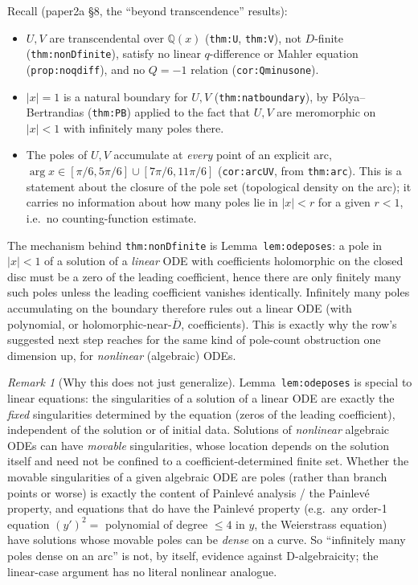 \documentclass[11pt]{article}
\theoremstyle{remark}
\newtheorem{remark}[theorem]{Remark}
\newcommand{\Q}{\mathbb Q}
\begin{document}
Recall (paper2a \S8, the ``beyond transcendence'' results):
\begin{itemize}
\item $U,V$ are transcendental over $\Q(x)$ (\texttt{thm:U}, \texttt{thm:V}), not $D$-finite
(\texttt{thm:nonDfinite}), satisfy no linear $q$-difference or Mahler equation
(\texttt{prop:noqdiff}), and no $Q=-1$ relation (\texttt{cor:Qminusone}).
\item $|x|=1$ is a natural boundary for $U,V$ (\texttt{thm:natboundary}), by
P\'olya--Bertrandias (\texttt{thm:PB}) applied to the fact that $U,V$ are meromorphic on
$|x|<1$ with infinitely many poles there.
\item The poles of $U,V$ accumulate at \emph{every} point of an explicit arc,
$\arg x\in[\pi/6,5\pi/6]\cup[7\pi/6,11\pi/6]$ (\texttt{cor:arcUV}, from \texttt{thm:arc}). This is a
statement about the closure of the pole set (topological density on the arc); it carries no
information about how many poles lie in $|x|<r$ for a given $r<1$, i.e.\ no counting-function
estimate.
\end{itemize}

The mechanism behind \texttt{thm:nonDfinite} is Lemma~\texttt{lem:odeposes}: a pole in $|x|<1$ of a
solution of a \emph{linear} ODE with coefficients holomorphic on the closed disc must be a zero of
the leading coefficient, hence there are only finitely many such poles unless the leading
coefficient vanishes identically. Infinitely many poles accumulating on the boundary therefore rules
out a linear ODE (with polynomial, or holomorphic-near-$\overline D$, coefficients). This is exactly
why the row's suggested next step reaches for the same kind of pole-count obstruction one dimension
up, for \emph{nonlinear} (algebraic) ODEs.

\begin{remark}[Why this does not just generalize]\label{rem:nogeneralize}
Lemma~\texttt{lem:odeposes} is special to linear equations: the singularities of a solution of a
linear ODE are exactly the \emph{fixed} singularities determined by the equation (zeros of the
leading coefficient), independent of the solution or of initial data. Solutions of \emph{nonlinear}
algebraic ODEs can have \emph{movable} singularities, whose location depends on the solution itself
and need not be confined to a coefficient-determined finite set. Whether the movable singularities
of a given algebraic ODE are poles (rather than branch points or worse) is exactly the content of
Painlev\'e analysis / the Painlev\'e property, and equations that do have the Painlev\'e property
(e.g.\ any order-1 equation $(y')^2=$ polynomial of degree $\le4$ in $y$, the Weierstrass equation)
have solutions whose movable poles can be \emph{dense} on a curve. So ``infinitely many poles dense
on an arc'' is not, by itself, evidence against D-algebraicity; the linear-case argument has no
literal nonlinear analogue.
\end{remark}
\end{document}
